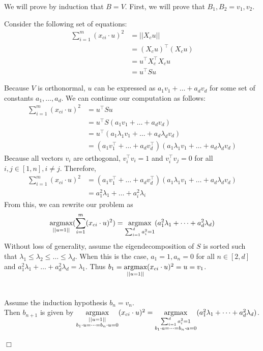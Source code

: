 \documentclass{article}%
\newenvironment{proof}{\noindent{\em Proof:}}{$\Box$~\\}
\begin{document}
\begin{proof}
We will prove by induction that $B=V$. First, we will prove that $B_1, B_2 = v_1, v_2$.

Consider the following set of equations: 
\begin{align*}
    \sum_{i=1}^m(x_{ci}\cdot u)^2&=||X_cu||\\
    &=(X_cu)^\intercal(X_cu)\\
    &=u^\intercal X_c^\intercal X_c u\\
    &=u^\intercal S u
\end{align*}

Because $V$ is orthonormal, $u$ can be expressed as $a_1v_1+\dots+a_dv_d$ for some set of constants $a_1,\dots,a_d$. We can continue our computation as follows:
\begin{align*}
    \sum_{i=1}^m(x_{ci}\cdot u)^2 &= u^\intercal S u\\
    &= u^\intercal S (a_1v_1+\dots+a_dv_d)\\
    &= u^\intercal(a_1\lambda_1v_1+\dots+a_d\lambda_dv_d)\\
    &= (a_1v_1^\intercal+\dots+a_dv_d^\intercal)(a_1\lambda_1v_1+\dots+a_d\lambda_dv_d)
\end{align*}
Because all vectors $v_i$ are orthogonal, $v_i^\intercal v_i=1$ and $v_i^\intercal v_j=0$ for all $i,j\in[1,n],i\neq j$. Therefore,
\begin{align*}
    \sum_{i=1}^m(x_{ci}\cdot u)^2 &=(a_1v_1^\intercal+\dots+a_dv_d^\intercal)(a_1\lambda_1v_1+\dots+a_d\lambda_dv_d)\\
    &= a_1^2\lambda_1+\dots+a_i^2\lambda_i
\end{align*}
From this, we can rewrite our problem as
\[
\underset{||u=1||}{\textnormal{argmax}}(\sum_{i=1}^m(x_{ci}\cdot u)^2)
=\underset{\sum_{i=1}^d a_i^2 =1}{\textnormal{argmax}}(a_1^2\lambda_1+\dots+a_d^2\lambda_d)
\]
Without loss of generality, assume the eigendecomposition of $S$ is sorted such that $\lambda_1 \leq \lambda_2 \leq \dots \leq \lambda_d$. When this is the case, $a_1=1, a_n=0$ for all $n\in[2,d]$ and $a_1^2\lambda_1+\dots+a_d^2\lambda_d=\lambda_1$. Thus $b_1=\underset{||u=1||}{\textnormal{argmax}}(x_{ci}\cdot u)^2=u=v_1$.
\\~\\~\\
Assume the induction hypothesis $b_n=v_n$. \\Then $b_{n+1}$ is given by $\underset{\substack{||u=1||\\b_1 \cdot u=\dots=b_{n}\cdot u=0}}{\textnormal{argmax}}(x_{ci}\cdot u)^2=\underset{\substack{\sum_{i=1}^d a_i^2 =1\\b_1\cdot a=\dots=b_n\cdot a =0}}{\textnormal{argmax}}(a_1^2\lambda_1+\dots+a_d^2\lambda_d)$.


\end{proof}
\end{document}
